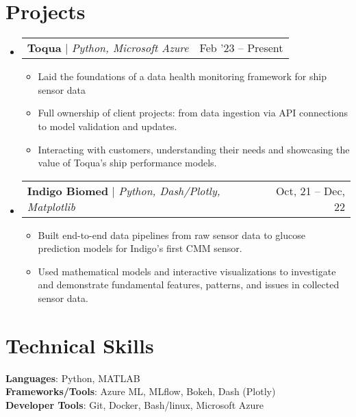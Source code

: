 \documentclass[letterpaper,11pt]{article}
\makeatletter
\newcommand{\resumeItem}[1]{
  \item\small{
    {#1 \vspace{-2pt}}
  }
}
\newcommand{\resumeProjectHeading}[2]{
    \item
    \begin{tabular*}{0.97\textwidth}{l@{\extracolsep{\fill}}r}
      \small#1 & #2 \\
    \end{tabular*}\vspace{-7pt}
}
\newcommand{\resumeSubHeadingListStart}{\begin{itemize}[leftmargin=0.15in, label={}]}
\newcommand{\resumeSubHeadingListEnd}{\end{itemize}}
\newcommand{\resumeItemListStart}{\begin{itemize}}
\newcommand{\resumeItemListEnd}{\end{itemize}\vspace{-5pt}}
\makeatother
\begin{document}
\section{Projects}
    \resumeSubHeadingListStart
      \resumeProjectHeading
          {\textbf{Toqua} $|$ \emph{Python, Microsoft Azure}}{Feb '23 -- Present}
          \resumeItemListStart
            \resumeItem{Laid the foundations of a data health monitoring framework for ship sensor data}
            \resumeItem{Full ownership of client projects: from data ingestion via API connections to model validation and updates.}
            \resumeItem{Interacting with customers, understanding their needs and showcasing the value of Toqua's ship performance models.}
          \resumeItemListEnd
      \resumeProjectHeading
          {\textbf{Indigo Biomed} $|$ \emph{Python, Dash/Plotly, Matplotlib}}{Oct, 21 -- Dec, 22}
          \resumeItemListStart
            \resumeItem{Built end-to-end data pipelines from raw sensor data to glucose prediction models for Indigo’s first CMM sensor.} 
            \resumeItem{Used mathematical models and interactive visualizations to investigate and demonstrate fundamental features, patterns, and issues in collected sensor data.}
          \resumeItemListEnd
    \resumeSubHeadingListEnd



%
\section{Technical Skills}
 \begin{itemize}[leftmargin=0.15in, label={}]
    \small{\item{
     \textbf{Languages}{: Python, MATLAB} \\
     \textbf{Frameworks/Tools}{: Azure ML, MLflow, Bokeh, Dash (Plotly)} \\
     \textbf{Developer Tools}{: Git, Docker, Bash/linux, Microsoft Azure} \\
    }}
 \end{itemize}


\end{document}
